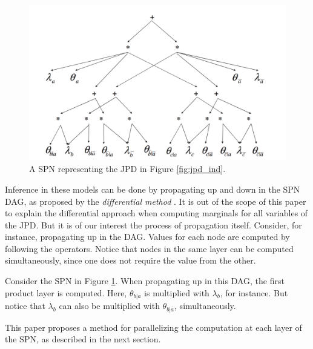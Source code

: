 \begin{figure}[hbt]
    \begin{center}
    \includegraphics[width=\textwidth]{figures/spn.png}
    \caption{A SPN representing the JPD in Figure \ref{fig:jpd_ind}.}
    \label{fig:spn}
    \end{center}
\end{figure}

Inference in these models can be done by propagating up and down in the SPN DAG, as proposed by the \emph{differential method} \cite{Darwiche:2003hx}.
It is out of the scope of this paper to explain the differential approach when computing marginals for all variables of the JPD.
But it is of our interest the process of propagation itself.
Consider, for instance, propagating up in the DAG.
Values for each node are computed by following the operators.
Notice that nodes in the same layer can be computed simultaneously, since one does not require the value from the other.

\begin{example}
    Consider the SPN in Figure \ref{fig:spn}.
    When propagating up in this DAG, the first product layer is computed.
    Here, $\theta_{b|a}$ is multiplied with $\lambda_b$, for instance.
    But notice that $\lambda_b$ can also be multiplied with $\theta_{b|\overline{a}}$, simultaneously.
\end{example}

This paper proposes a method for parallelizing the computation at each layer of the SPN, as described in the next section.
